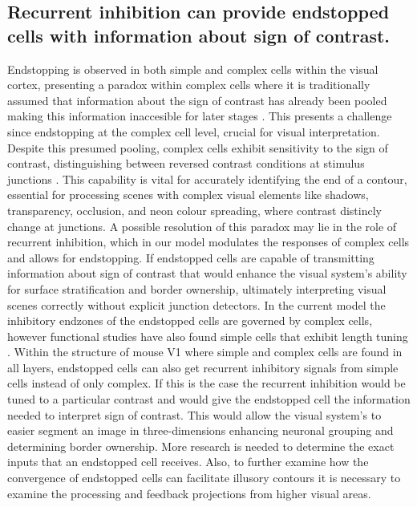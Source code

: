 \documentclass[12pt]{article}
\begin{document}
\subsection{Recurrent inhibition can provide endstopped cells with information about sign of contrast.} %
Endstopping is observed in both simple and complex cells within the visual cortex, presenting a paradox within complex cells where it is traditionally assumed that information about the sign of contrast has already been pooled making this information inaccesible for later stages \autocite{yazdanbakhshEndStoppingV12006}. This presents a challenge since endstopping at the complex cell level, crucial for visual interpretation. Despite this presumed pooling, complex cells exhibit sensitivity to the sign of contrast, distinguishing between reversed contrast conditions at stimulus junctions \autocite{yazdanbakhshEndStoppingV12006}. This capability is vital for accurately identifying the end of a contour, essential for processing scenes with complex visual elements like shadows, transparency, occlusion, and neon colour spreading, where contrast distincly change at junctions. A possible resolution of this paradox may lie in the role of recurrent inhibition, which in our model modulates the responses of complex cells and allows for endstopping. If endstopped cells are capable of transmitting information about sign of contrast that would enhance the visual system's ability for surface stratification and border ownership, ultimately interpreting visual scenes correctly without explicit junction detectors. In the current model the inhibitory endzones of the endstopped cells are governed by complex cells, however functional studies have also found simple cells that exhibit length tuning \autocite{andersonMembranePotentialConductance2001}. Within the structure of mouse V1 where simple and complex cells are found in all layers, endstopped cells can also get recurrent inhibitory signals from simple cells instead of only complex. If this is the case the recurrent inhibition would be tuned to a particular contrast and would give the endstopped cell the information needed to interpret sign of contrast. This would allow the visual system's to easier segment an image in three-dimensions enhancing neuronal grouping and determining border ownership. More research is needed to determine the exact inputs that an endstopped cell receives. Also, to further examine how the convergence of endstopped cells can facilitate illusory contours it is necessary to examine the processing and feedback projections from higher visual areas.
\end{document}
